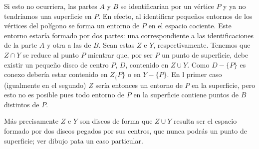 \documentclass[GTS.tex]{subfiles}
\begin{document}
\begin{dem}
\begin{enumerate}

Si esto no ocurriera, las partes $A$ y $B$ se identificarían por un vértice $P$ y ya no tendríamos una superficie en $P$. En efecto, al identificar pequeños entornos de los vértices del polígono se forma un entorno de $P$ en el espacio cociente. Este entorno estaría formado por dos partes: una  correspondiente a las identificaciones de la parte $A$ y otra a las de $B$. Sean estas $Z$ e $Y$, respectivamente. Tenemos que $Z\cap Y$ se reduce al punto $P$ mientrar que, por ser $P$ un punto de superficie, debe existir un pequeño disco de centro $P$, $D$,  contenido en $Z\cup Y$.  Como $D-\{P\}$ es conexo debería estar contenido en $Z_\{P\}$ o en $Y-\{P\}$. En l primer caso (igualmente en el segundo) $Z$ sería entonces un entorno de $P$ en la superficie, pero esto no es posible pues  todo entorno de $P$  en la superficie contiene puntos de $B$ distintos de $P$. 
\par
Más precisamente $Z$ e $Y$ son discos de forma que $Z\cup Y$ resulta ser el espacio formado por dos discos pegados por sus centros, que nunca podrás un punto de superficie; ver dibujo pata un caso particular. 


\end{enumerate}
\end{dem}
\end{document}
